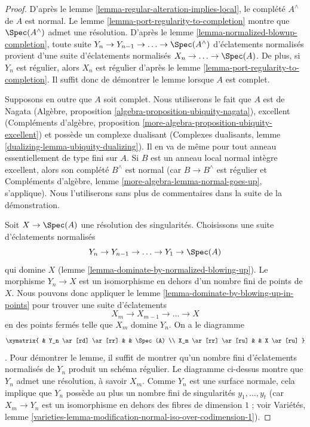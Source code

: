 \begin{proof} D'après le lemme \ref{lemma-regular-alteration-implies-local}, le complété $A^\wedge$ de $A$ est normal. Le lemme \ref{lemma-port-regularity-to-completion} montre que $\Spec(A^\wedge)$ admet une résolution. D'après le lemme \ref{lemma-normalized-blowup-completion}, toute suite $Y_n \to Y_{n - 1} \to \ldots \to \Spec(A^\wedge)$ d'éclatements normalisés provient d'une suite d'éclatements normalisés $X_n \to \ldots \to \Spec(A)$. De plus, si $Y_n$ est régulier, alors $X_n$ est régulier d'après le lemme \ref{lemma-port-regularity-to-completion}. Il suffit donc de démontrer le lemme lorsque $A$ est complet.

\medskip\noindent Supposons en outre que $A$ soit complet. Nous utiliserons le fait que $A$ est de Nagata (Algèbre, proposition \ref{algebra-proposition-ubiquity-nagata}), excellent (Compléments d'algèbre, proposition \ref{more-algebra-proposition-ubiquity-excellent}) et possède un complexe dualisant (Complexes dualisants, lemme \ref{dualizing-lemma-ubiquity-dualizing}). Il en va de même pour tout anneau essentiellement de type fini sur $A$. Si $B$ est un anneau local normal intègre excellent, alors son complété $B^\wedge$ est normal (car $B \to B^\wedge$ est régulier et Compléments d'algèbre, lemme \ref{more-algebra-lemma-normal-goes-up}, s'applique). Nous l'utiliserons sans plus de commentaires dans la suite de la démonstration.

\medskip\noindent Soit $X \to \Spec(A)$ une résolution des singularités. Choisissons une suite d'éclatements normalisés $$
Y_n \to Y_{n - 1} \to \ldots \to Y_1 \to \Spec(A)
$$ qui domine $X$ (lemme \ref{lemma-dominate-by-normalized-blowing-up}). Le morphisme $Y_n \to X$ est un isomorphisme en dehors d'un nombre fini de points de $X$. Nous pouvons donc appliquer le lemme \ref{lemma-dominate-by-blowing-up-in-points} pour trouver une suite d'éclatements $$
X_m \to X_{m - 1} \to \ldots \to X
$$ en des points fermés telle que $X_m$ domine $Y_n$. On a le diagramme $$
\xymatrix{
& Y_n \ar[rd] \ar[rr] & & \Spec(A) \\
X_m \ar[rr] \ar[ru] & & X \ar[ru]
}
$$. Pour démontrer le lemme, il suffit de montrer qu'un nombre fini d'éclatements normalisés de $Y_n$ produit un schéma régulier. Le diagramme ci-dessus montre que $Y_n$ admet une résolution, à savoir $X_m$. Comme $Y_n$ est une surface normale, cela implique que $Y_n$ possède au plus un nombre fini de singularités $y_1, \ldots, y_t$ (car $X_m \to Y_n$ est un isomorphisme en dehors des fibres de dimension $1$ ; voir Variétés, lemme \ref{varieties-lemma-modification-normal-iso-over-codimension-1}).


\end{proof}

